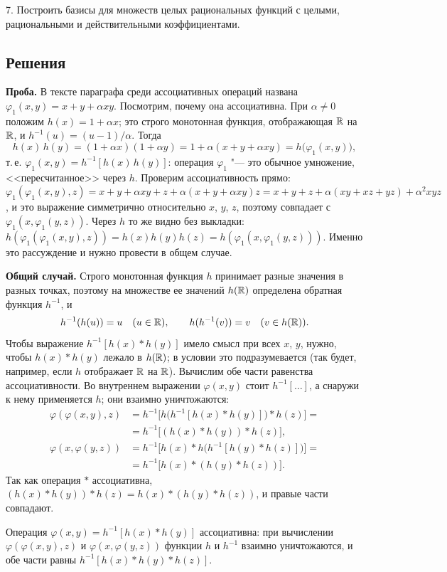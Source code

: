 7. Построить базисы для множеств целых рациональных функций с целыми,
рациональными и действительными коэффициентами.

\subsection*{Решения}

\begin{solution}[1 (\S\,4)]
\textbf{Проба.} В тексте параграфа среди ассоциативных операций названа
$\varphi_1(x,y)=x+y+\alpha xy$. Посмотрим, почему она ассоциативна. При
$\alpha\ne0$ положим $h(x)=1+\alpha x$; это строго монотонная функция,
отображающая $\mathbb R$ на $\mathbb R$, и $h^{-1}(u)=(u-1)/\alpha$. Тогда
\[
h(x)\,h(y)=(1+\alpha x)(1+\alpha y)=1+\alpha(x+y+\alpha xy)=h\bigl(\varphi_1(x,y)\bigr),
\]
т.\,е. $\varphi_1(x,y)=h^{-1}[h(x)\,h(y)]$: операция $\varphi_1$ "--- это
обычное умножение, <<пересчитанное>> через $h$. Проверим ассоциативность
прямо: $\varphi_1(\varphi_1(x,y),z)=x+y+\alpha xy+z+\alpha(x+y+\alpha xy)z
=x+y+z+\alpha(xy+xz+yz)+\alpha^2xyz$, и это выражение симметрично
относительно $x$, $y$, $z$, поэтому совпадает с $\varphi_1(x,\varphi_1(y,z))$.
Через $h$ то же видно без выкладки:
$h(\varphi_1(\varphi_1(x,y),z))=h(x)h(y)h(z)=h(\varphi_1(x,\varphi_1(y,z)))$.
Именно это рассуждение и нужно провести в общем случае.

\textbf{Общий случай.} Строго монотонная функция $h$ принимает разные
значения в разных точках, поэтому на множестве ее значений $h(\mathbb R)$
определена обратная функция $h^{-1}$, и
\[
h^{-1}(h(u))=u\quad(u\in\mathbb R),\qquad h(h^{-1}(v))=v\quad(v\in h(\mathbb R)).
\]
Чтобы выражение $h^{-1}[h(x)*h(y)]$ имело смысл при всех $x$, $y$, нужно,
чтобы $h(x)*h(y)$ лежало в $h(\mathbb R)$; в условии это подразумевается (так
будет, например, если $h$ отображает $\mathbb R$ на $\mathbb R$). Вычислим обе части
равенства ассоциативности. Во внутреннем выражении $\varphi(x,y)$ стоит
$h^{-1}[\dots]$, а снаружи к нему применяется $h$; они взаимно уничтожаются:
\begin{align*}
\varphi(\varphi(x,y),z)&=h^{-1}\bigl[h\bigl(h^{-1}[h(x)*h(y)]\bigr)*h(z)\bigr]={}\\
&=h^{-1}\bigl[(h(x)*h(y))*h(z)\bigr],\\
\varphi(x,\varphi(y,z))&=h^{-1}\bigl[h(x)*h\bigl(h^{-1}[h(y)*h(z)]\bigr)\bigr]={}\\
&=h^{-1}\bigl[h(x)*(h(y)*h(z))\bigr].
\end{align*}
Так как операция $*$ ассоциативна, $(h(x)*h(y))*h(z)=h(x)*(h(y)*h(z))$,
и правые части совпадают.

\answer Операция $\varphi(x,y)=h^{-1}[h(x)*h(y)]$ ассоциативна: при
вычислении $\varphi(\varphi(x,y),z)$ и $\varphi(x,\varphi(y,z))$ функции
$h$ и $h^{-1}$ взаимно уничтожаются, и обе части равны
$h^{-1}[h(x)*h(y)*h(z)]$.
\end{solution}

